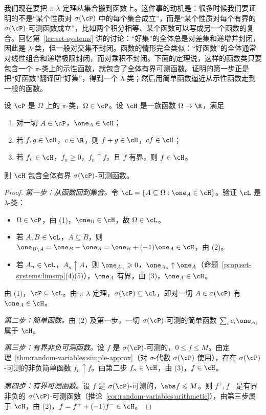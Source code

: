 
我们现在要把 $\pi$-$\lambda$ 定理从集合搬到函数上。这件事的动机是：很多时候我们要证明的不是“某个性质对 $\sigma(\cP)$ 中的每个集合成立”，而是“某个性质对每个有界的 $\sigma(\cP)$-可测函数成立”，比如两个积分相等、某个函数可以写成另一个函数的复合。回忆第~\ref{lec:set-systems} 讲的讨论：“好集”的全体总是对差集和递增并封闭，因此是 $\lambda$-类，但一般对交集不封闭。函数的情形完全类似：“好函数”的全体通常对线性组合和递增极限封闭，而对乘积不封闭。下面的定理说，这样的函数类只要包含一个 $\pi$-类上的示性函数，就包含了全体有界可测函数。证明的第一步正是把“好函数”翻译回“好集”，得到一个 $\lambda$-类；然后用简单函数逼近从示性函数走到一般的函数。

\begin{theorem}[函数形式的单调类定理]\label{thm:random-variables:monotone-class}
设 $\cP$ 是 $\Omega$ 上的 $\pi$-类，$\Omega\in\cP$。设 $\cH$ 是一族函数 $\Omega\to\R$，满足
\begin{enumerate}
\item 对一切 $A\in\cP$，$\one_A\in\cH$；
\item 若 $f,g\in\cH$，$c\in\R$，则 $f+g\in\cH$，$cf\in\cH$；
\item 若 $f_n\in\cH$，$f_n\geqslant0$，$f_n\uparrow f$，且 $f$ 有界，则 $f\in\cH$。
\end{enumerate}
则 $\cH$ 包含全体有界 $\sigma(\cP)$-可测函数。
\end{theorem}
\begin{proof}
\emph{第一步：从函数回到集合。}令 $\cL=\{A\subseteq\Omega:\one_A\in\cH\}$。验证 $\cL$ 是 $\lambda$-类：
\begin{itemize}
\item $\Omega\in\cP$，由 (1)，$\one_\Omega\in\cH$，故 $\Omega\in\cL$。
\item 若 $A,B\in\cL$，$A\subseteq B$，则 $\one_{B\setminus A}=\one_B-\one_A=\one_B+(-1)\one_A\in\cH$，由 (2)。
\item 若 $A_n\in\cL$，$A_n\uparrow A$，则 $\one_{A_n}\geqslant0$，$\one_{A_n}\uparrow\one_A$（命题~\ref{prop:set-systems:limsup}(4)(5)），$\one_A$ 有界，由 (3)，$\one_A\in\cH$。
\end{itemize}
由 (1)，$\cP\subseteq\cL$。由 $\pi$-$\lambda$ 定理，$\sigma(\cP)\subseteq\cL$，即对一切 $A\in\sigma(\cP)$ 有 $\one_A\in\cH$。

\emph{第二步：简单函数。}由 (2) 及第一步，一切 $\sigma(\cP)$-可测的简单函数 $\sum_ic_i\one_{A_i}$ 属于 $\cH$。

\emph{第三步：有界非负可测函数。}设 $f$ 是 $\sigma(\cP)$-可测的，$0\leqslant f\leqslant M$。由定理~\ref{thm:random-variables:simple-approx}（对 $\sigma$-代数 $\sigma(\cP)$ 使用），存在 $\sigma(\cP)$-可测的非负简单函数 $f_n\uparrow f$。由第二步 $f_n\in\cH$，由 (3)，$f\in\cH$。

\emph{第四步：有界可测函数。}设 $f$ 是 $\sigma(\cP)$-可测的，$\abs f\leqslant M$。则 $f^+,f^-$ 是有界非负的 $\sigma(\cP)$-可测函数（推论~\ref{cor:random-variables:arithmetic}），由第三步属于 $\cH$，由 (2)，$f=f^++(-1)f^-\in\cH$。
\end{proof}

